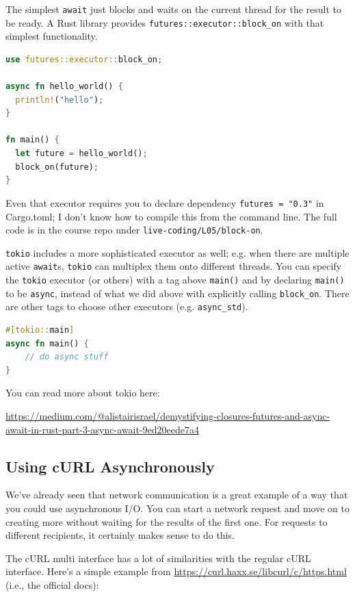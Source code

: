 The simplest \texttt{await} just blocks and waits on the current
thread for the result to be ready. A Rust library
provides \texttt{futures::executor::block\_on} with that
simplest functionality.

\begin{lstlisting}[language=Rust]
use futures::executor::block_on;

async fn hello_world() {
  println!("hello");
}

fn main() {
  let future = hello_world();
  block_on(future);
}
\end{lstlisting}
Even that executor requires you to declare dependency \texttt{futures = "0.3"}
in Cargo.toml; I don't know how to compile this from the command line.
The full code is in the course repo under
\texttt{live-coding/L05/block-on}.

\texttt{tokio} includes a more sophisticated executor as well; e.g. when
there are multiple active \texttt{await}s, \texttt{tokio} can multiplex them onto
different threads. You can specify the \texttt{tokio} executor (or others) with a
tag above {\tt main()} and by declaring \texttt{main()} to be \texttt{async},
instead of what we did above with explicitly calling \texttt{block\_on}.
There are other tags to choose other executors (e.g. \texttt{async\_std}).
\begin{lstlisting}[language=Rust]
#[tokio::main]
async fn main() {
    // do async stuff
}
\end{lstlisting}
You can read more about tokio here:
\begin{center}
\url{https://medium.com/@alistairisrael/demystifying-closures-futures-and-async-await-in-rust-part-3-async-await-9ed20eede7a4}
\end{center}

\subsection*{Using cURL Asynchronously}
We've already seen that network communication is a great example of a way that you could use asynchronous  I/O. You can start a network request and move on to creating more without waiting for the results of the first one. For requests to different recipients, it certainly makes sense to do this.

The cURL multi interface has a lot of similarities with the regular cURL interface. Here's a simple example from \url{https://curl.haxx.se/libcurl/c/https.html} (i.e., the official docs):

